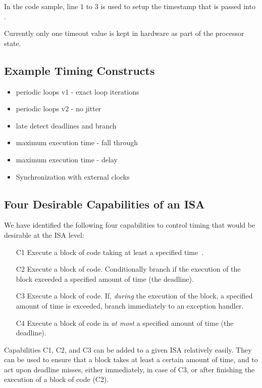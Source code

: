 In the code sample, line 1 to 3 is used to setup the timestamp that is passed into \exceptiononexpire.

Currently only one timeout value is kept in hardware as part of the processor state.

\subsection{Example Timing Constructs}
\label{sec:timing_instruction_usage_notes}

\begin{itemize}
  \item periodic loops v1 - exact loop iterations
  \item periodic loops v2 - no jitter
  \item late detect deadlines and branch
  \item maximum execution time - fall through
  \item maximum execution time - delay
  \item Synchronization with external clocks
\end{itemize}

\subsection{Four Desirable Capabilities of an ISA}
We have identified the following four capabilities to control timing that would be desirable at the ISA level:
\begin{itemize}
  \item[C1] Execute a block of code taking at least a specified time~\cite{ip2006processor}.
  \item[C2] Execute a block of code. Conditionally branch if the execution of the block exceeded a specified amount of time (the deadline).
  \item[C3] Execute a block of code. If, \emph{during} the execution of the block, a specified amount of time is exceeded, branch immediately to an exception handler.
  \item[C4] Execute a block of code in \emph{at most} a specified amount of time (the deadline).
\end{itemize}
Capabilities C1, C2, and C3 can be added to a given ISA relatively easily.
They can be used to ensure that a block takes at least a certain amount of time, and to act upon deadline misses, either immediately, in case of C3, or after finishing the execution of a block of code (C2).

